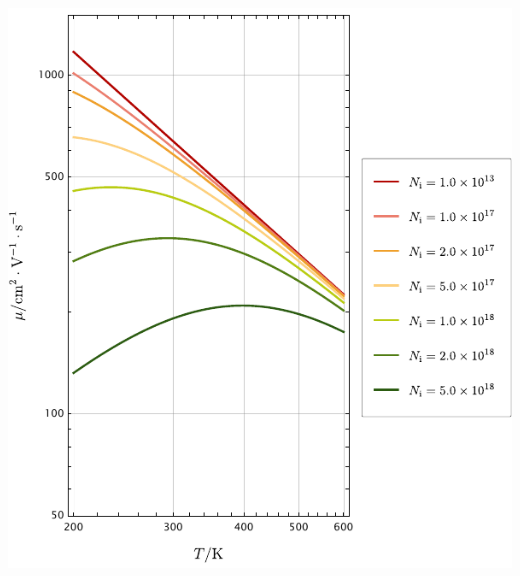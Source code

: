 \begin{Figure}[迁移率的曲线图]
    \begin{FigureSub}[迁移率和温度的关系]
        \hspace{0.25cm}
        \includegraphics[scale=0.65]
        {Mathematica/output/MobilityT.pdf}
    \end{FigureSub}
    \hspace{1cm}
    \begin{FigureSub}[迁移率和掺杂浓度的关系]
        \hspace{0.25cm}

\end{FigureSub}
\end{Figure}
